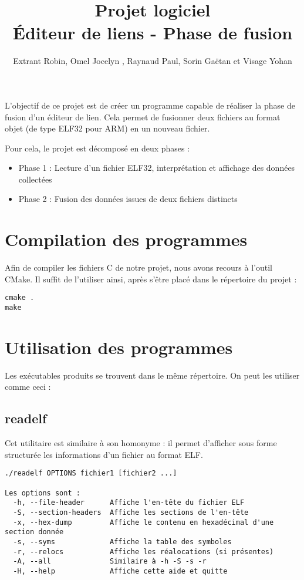 \documentclass[a4paper,11pt]{article}
\title{Projet logiciel \\ Éditeur de liens - Phase de fusion}
\author{Extrant Robin, Omel Jocelyn , Raynaud Paul, Sorin Gaëtan et Visage Yohan}
\date{}
\begin{document}
\maketitle

L'objectif de ce projet est de créer un programme capable de réaliser la phase de fusion d'un éditeur de lien. Cela permet de fusionner deux fichiers au format objet (de type ELF32 pour ARM) en un nouveau fichier.

Pour cela, le projet est décomposé en deux phases :
\begin{itemize}
\item Phase 1 : Lecture d'un fichier ELF32, interprétation et affichage des données collectées
\item Phase 2 : Fusion des données issues de deux fichiers distincts
\end{itemize}

\section{Compilation des programmes}
Afin de compiler les fichiers C de notre projet, nous avons recours à l'outil CMake. Il suffit de l'utiliser ainsi, après s'être placé dans le répertoire du projet :
\begin{verbatim}
cmake .
make
\end{verbatim}

\section{Utilisation des programmes}
Les exécutables produits se trouvent dans le même répertoire. On peut les utiliser comme ceci :
\subsection{readelf}
Cet utilitaire est similaire à son homonyme : il permet d'afficher sous forme structurée les informations d'un fichier au format ELF.
\begin{verbatim}
./readelf OPTIONS fichier1 [fichier2 ...]

Les options sont :
  -h, --file-header      Affiche l'en-tête du fichier ELF
  -S, --section-headers  Affiche les sections de l'en-tête
  -x, --hex-dump         Affiche le contenu en hexadécimal d'une section donnée
  -s, --syms             Affiche la table des symboles
  -r, --relocs           Affiche les réalocations (si présentes)
  -A, --all              Similaire à -h -S -s -r
  -H, --help             Affiche cette aide et quitte
\end{verbatim}
\end{document}
